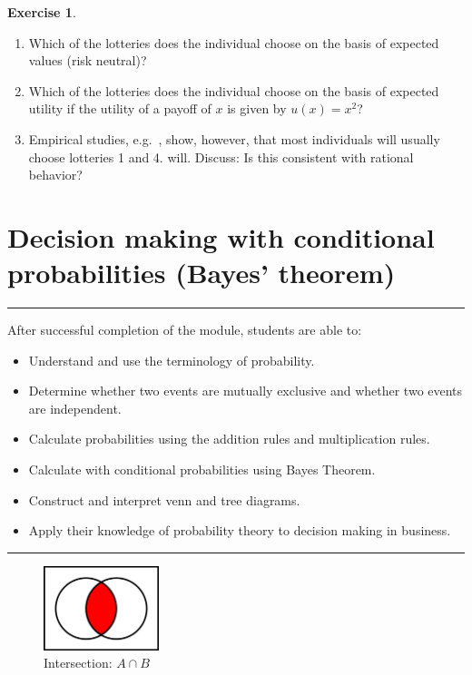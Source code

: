 \documentclass[
  12pt,
  oneside]{book}
\providecommand{\tightlist}{%
  \setlength{\itemsep}{0pt}\setlength{\parskip}{0pt}}
\theoremstyle{definition}
\theoremstyle{definition}
\theoremstyle{definition}
\newtheorem{exercise}{Exercise}[chapter]
\theoremstyle{definition}
\theoremstyle{remark}
\begin{document}
\begin{exercise}
\begin{enumerate}
\def\labelenumi{\alph{enumi})}
\tightlist
\item
  Which of the lotteries does the individual choose on the basis of expected values (risk neutral)?
\item
  Which of the lotteries does the individual choose on the basis of expected utility if the utility of a payoff of \(x\) is given by \(u(x) = x^2\)?
\item
  Empirical studies, e.g.~\cite{Camerer1992Recent}, show, however, that most individuals will usually choose lotteries 1 and 4. will. Discuss: Is this consistent with rational behavior?
\end{enumerate}

\end{exercise}

\section{Decision making with conditional probabilities (Bayes' theorem)}\label{decision-making-with-conditional-probabilities-bayes-theorem}

\begin{center}\rule{0.5\linewidth}{0.5pt}\end{center}

After successful completion of the module, students are able to:

\begin{itemize}
\tightlist
\item
  Understand and use the terminology of probability.
\item
  Determine whether two events are mutually exclusive and whether two events are independent.
\item
  Calculate probabilities using the addition rules and multiplication rules.
\item
  Calculate with conditional probabilities using Bayes Theorem.
\item
  Construct and interpret venn and tree diagrams.
\item
  Apply their knowledge of probability theory to decision making in business.
\end{itemize}

\begin{center}\rule{0.5\linewidth}{0.5pt}\end{center}

\begin{figure}
\centering
\includegraphics[width=0.3\textwidth,height=\textheight]{fig/intersection.png}
\caption{\label{fig:afig} Intersection: \(A \cap B\)}
\end{figure}
\end{document}
